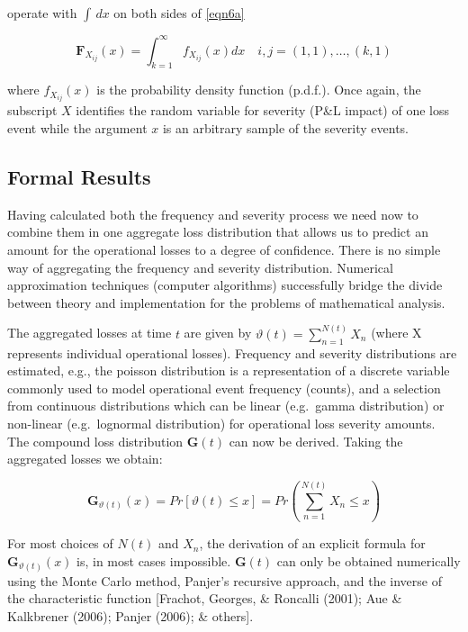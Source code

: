 \documentclass{DissertateUSU}
\begin{document}
\begin{itemize}
operate with $\int\,dx$ on both sides of \ref{eqn6a}

\singlespacing
\begin{equation}
\mathbf{F}_{X_{ij}}(x)=\int_{k=1}^{\infty} f_{X_{ij}}(x)dx \quad{i,j}= (1,1),\ldots, (k,1)\label{eqn6b}
\end{equation}
\doublespacing

where $f_{X_{ij}}(x)$ is the probability density function (p.d.f.). Once again, the subscript $X$ identifies the random variable for severity (P\&L impact) of one loss event while the argument $x$ is an arbitrary sample of the severity events.
\end{itemize}

\subsection{Formal Results}

Having calculated both the frequency and severity process we need now to
combine them in one aggregate loss distribution that allows us to
predict an amount for the operational losses to a degree of confidence.
There is no simple way of aggregating the frequency and severity
distribution. Numerical approximation techniques (computer algorithms)
successfully bridge the divide between theory and implementation for the
problems of mathematical analysis.\medskip

The aggregated losses at time \(t\) are given by
\(\vartheta(t) = \sum_{n=1}^{N(t)} X_{n}\) (where X represents
individual operational losses). Frequency and severity distributions are
estimated, e.g., the poisson distribution is a representation of a
discrete variable commonly used to model operational event frequency
(counts), and a selection from continuous distributions which can be
linear (e.g.~gamma distribution) or non-linear (e.g.~lognormal
distribution) for operational loss severity amounts. The compound loss
distribution \(\mathbf{G}(t)\) can now be derived. Taking the aggregated
losses we obtain:

\singlespacing

\begin{equation}\label{Compound_losses}
\mathbf{G}_{\vartheta(t)}(x)=Pr[\vartheta(t)\leq x]=Pr\left(\sum_{n=1}^{N(t)}X_{n} \leq x\right)
\end{equation} \doublespacing

For most choices of \(N(t)\) and \(X_{n}\), the derivation of an
explicit formula for \(\mathbf{G}_{\vartheta(t)}(x)\) is, in most cases
impossible. \(\mathbf{G}(t)\) can only be obtained numerically using the
Monte Carlo method, Panjer's recursive approach, and the inverse of the
characteristic function {[}Frachot, Georges, \& Roncalli (2001); Aue \&
Kalkbrener (2006); Panjer (2006); \& others{]}. \medskip
\end{document}
